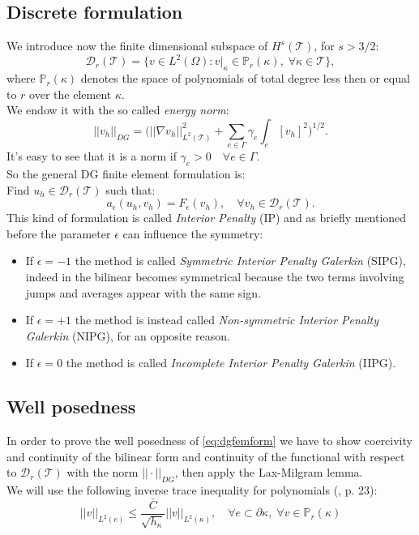 \documentclass[12pt, a4paper]{article}
\theoremstyle{definition}
\theoremstyle{plain}
\theoremstyle{plain}
\begin{document}
\subsection{Discrete formulation}
We introduce now the finite dimensional subspace of $H^s(\mathcal{T})$, for $s>3/2$:
\begin{equation} \label{eq:dgspace}
	\mathcal{D}_r(\mathcal{T}) = \{ v \in L^2(\Omega) : v|_\kappa \in \mathbb{P}_r(\kappa), \; \forall \kappa \in \mathcal{T}  \},
\end{equation}
where $\mathbb{P}_r(\kappa)$ denotes the space of polynomials of total degree less then or equal to $r$ over the element $\kappa$.\\
We endow it with the so called \textit{energy norm}:
\begin{equation*}
	|\!|v_h|\!|_{DG} = \bigg( |\!|\nabla v_h|\!|^2_{L^2(\mathcal{T})} + \sum_{e \in \Gamma} \gamma_e \int_e [v_h]^2 \bigg)^{1/2}.
\end{equation*}
It's easy to see that it is a norm if $\gamma_e > 0 \quad \forall e \in \Gamma$.\\
So the general DG finite element formulation is:\\
Find $u_h \in \mathcal{D}_r(\mathcal{T})$ such that:
\begin{equation} \label{eq:dgfemform}
	a_\epsilon(u_h, v_h) = F_\epsilon(v_h), \quad \forall v_h \in \mathcal{D}_r(\mathcal{T}).
\end{equation}
This kind of formulation is called \textit{Interior Penalty} (IP) and as briefly mentioned before the parameter $\epsilon$ can influence the symmetry:
\begin{itemize}
\item
If $\epsilon = -1$ the method is called \textit{Symmetric Interior Penalty Galerkin} (SIPG), indeed in the bilinear becomes symmetrical because the two terms involving jumps and averages appear with the same sign.
\item
If  $\epsilon = +1$ the method is instead called \textit{Non-symmetric Interior Penalty Galerkin} (NIPG), for an opposite reason.
\item
If $\epsilon = 0$ the method is called \textit{Incomplete Interior Penalty Galerkin} (IIPG).
\end{itemize}
\subsection{Well posedness}
In order to prove the well posedness of \eqref{eq:dgfemform} we have to show coercivity and continuity of the bilinear form and continuity of the functional with respect to $\mathcal{D}_r(\mathcal{T})$ with the norm $||\cdot||_{DG}$, then apply the Lax-Milgram lemma.\\
We will use the following inverse trace inequality for polynomials (\cite{riviere}, p. 23):
\begin{equation} \label{eq:trineq}
	|\!|v|\!|_{L^2(e)} \leq \frac{\bar{C}}{\sqrt{h_\kappa}} |\!|v|\!|_{L^2(\kappa)}, \quad \forall e \subset \partial \kappa, \; \forall v \in \mathbb{P}_r(\kappa)
\end{equation}
\end{document}
